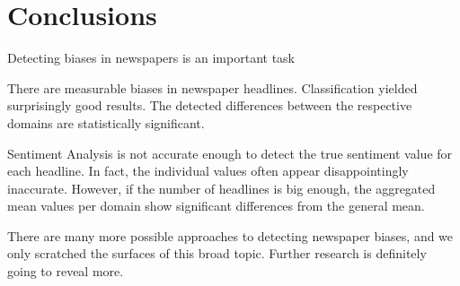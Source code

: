 \documentclass[final]{ieee}
\begin{document}
\section{Conclusions}\label{sec:conclusions}

Detecting biases in newspapers is an important task

There are measurable biases in newspaper headlines. Classification yielded surprisingly good results. The detected differences between the respective domains are statistically significant.

Sentiment Analysis is not accurate enough to detect the true sentiment value for each headline. In fact, the individual values often appear disappointingly inaccurate. However, if the number of headlines is big enough, the aggregated mean values per domain show significant differences from the general mean.

There are many more possible approaches to detecting newspaper biases, and we only scratched the surfaces of this broad topic. Further research is definitely going to reveal more.

           
\end{document}
